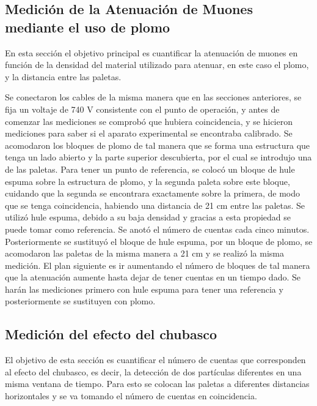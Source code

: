 \documentclass[a4paper,10pt]{article}
\numberwithin{equation}{section}
\begin{document}
\subsection{Medición de la Atenuación de Muones mediante el uso de plomo}
\label{ss:medicionplomo}

En esta sección el objetivo principal es cuantificar la atenuación de muones en 
función de la densidad del material utilizado para atenuar, en este caso el plomo, 
y la distancia entre las paletas. 

\vspace{.3cm}

Se conectaron los cables de la misma manera que en
las secciones anteriores, se fija un voltaje de 740 V consistente con el punto de 
operación, y antes de comenzar las 
mediciones se comprobó que hubiera coincidencia, y se hicieron mediciones para saber
si el aparato experimental se encontraba calibrado. Se acomodaron los bloques de plomo 
de tal manera que se forma una estructura que tenga un lado abierto y la parte 
superior descubierta, por el cual se introdujo una de las paletas. Para tener un 
punto de referencia, se colocó un bloque de hule espuma sobre la estructura de plomo,
y la segunda paleta sobre este bloque, cuidando que la segunda se encontrara 
exactamente sobre la primera, de modo que se tenga coincidencia, habiendo una 
distancia de 21 cm entre las paletas. Se utilizó hule espuma, debido a su baja 
densidad y gracias a esta propiedad se puede tomar como referencia. Se anotó el 
número de cuentas cada cinco minutos. Posteriormente se sustituyó el bloque de hule
espuma, por un bloque de plomo, se acomodaron las paletas de la misma manera a 21 cm
y se realizó la misma medición. El plan siguiente es ir aumentando el número de bloques de tal
manera que la atenuación aumente hasta dejar de tener cuentas en un tiempo dado. 
Se harán las mediciones primero con hule espuma para tener una referencia y
posteriormente se sustituyen con plomo.

\subsection{Medición del efecto del chubasco}
\label{ss:medicionchubasco}

El objetivo de esta sección es cuantificar el número de cuentas que corresponden 
al efecto del chubasco, es decir, la detección de dos partículas diferentes en una misma 
ventana de tiempo. Para esto se colocan las paletas a diferentes distancias horizontales 
y se va tomando el número de cuentas en coincidencia.
\end{document}
